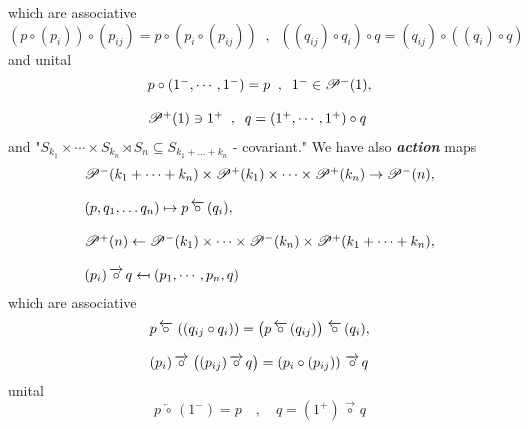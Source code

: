 \documentclass[leqno]{article}
\newcommand{\myemph}[1]{{\it{\bf{#1}}}}
\newcommand{\biop}{\mathscr{P}}
\newcommand{\circleftarrow}{\,\overleftarrow{\circ}\,}
\newcommand{\circrightarrow}{\,\overrightarrow{\circ}\,}
\numberwithin{equation}{section}
\begin{document}
which are associative 
\begin{equation}
				(p\circ(p_{i}))\circ(p_{ij})=p\circ\left( p_{i}\circ (p_{ij}) \right)\;\; , \;\; 
				\left( (q_{ij})\circ q_i \right)\circ q = (q_{ij})\circ \left( (q_{i})\circ q \right)
				\label{eq:1.4}
\end{equation}
and unital 
\begin{equation}
				\begin{array}[H]{l}
				p\circ(1^{-},\cdots, 1^{-})=p\;\; , \;\; 1^{-}\in \biop^{-}(1), \\\\
				\biop^{+}(1)\ni 1^{+} \;\; , \;\; q=(1^{+},\cdots ,1^{+})\circ q
				\end{array}
				\label{eq:1.5}
\end{equation}
and "$S_{k_{1}}\times \cdots \times S_{k_n}\rtimes S_{n}\subseteq S_{k_1+\ldots +
k_n}$ - covariant." We have also \myemph{action} maps 
\begin{equation}
				\begin{array}[H]{l}
								\biop^{-}(k_{1}+\cdots + k_{n})\times \biop^{+}(k_1)\times\cdots
								\times\biop^{+}(k_{n})\rightarrow\biop^{-}(n), \\\\
								(p,q_{1},\ldots q_{n}) \mapsto p \circleftarrow (q_{i}), \\\\
								\biop^{+}(n)\leftarrow \biop^{-}(k_{1})\times \cdots \times
								\biop^{-}(k_n)\times \biop^{+}(k_{1}+\cdots +k_{n}), \\\\
								(p_i)\circrightarrow q\mapsfrom (p_1,\cdots , p_n,q) 
				\end{array}
				\label{eq:1.6}
\end{equation}
which are associative
\begin{equation}
				\begin{array}[H]{l}
				p\circleftarrow \left( (q_{ij}\circ q_{i}) \right) = \left( p\circleftarrow
				(q_{i j}) \right)\circleftarrow (q_{i}), \\\\ 
				(p_{i})\circrightarrow \left( (p_{ij})\circrightarrow q \right) = \left(
								p_{i}\circ (p_{ij}) \right)\circrightarrow q
				\end{array}
								\label{eq:1.7}
\end{equation}
unital 
\begin{equation}
				p\circleftarrow(1^{-})=p \quad , \quad q=(1^{+})\circrightarrow q
				\label{eq:1.8}
\end{equation}
\end{document}
